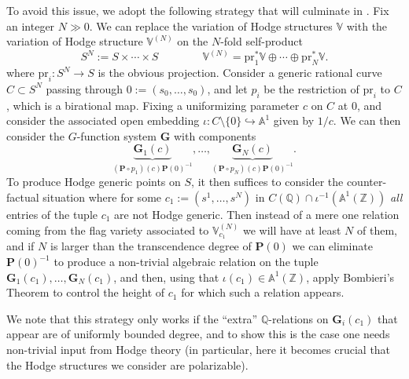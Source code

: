 \documentclass[10pt]{article}
\numberwithin{equation}{section}
\theoremstyle{plain}
\theoremstyle{definition}
\theoremstyle{remark}
\newcommand{\Q}{\mathbb{Q}}
\begin{document}
\medskip

To avoid this issue, we adopt the following strategy that will culminate in . Fix an integer $N \gg 0$. We can replace the variation of Hodge structures $\mathbb{V}$ with the variation of Hodge structure $\mathbb{V}^{(N)}$ on the $N$-fold self-product 
\begin{equation}
\label{SNprod}
S^{N} := S \times \cdots \times S\hspace{4em} \mathbb{V}^{(N)} = \textrm{pr}^{*}_{1} \mathbb{V} \oplus \cdots \oplus \textrm{pr}^{*}_{N} \mathbb{V} .
\end{equation}
where $\textrm{pr}_{i} : S^{N} \to S$ is the obvious projection. Consider a generic rational curve $C \subset S^{N}$ passing through $0 := (s_{0}, \hdots, s_{0})$, and let $p_{i}$ be the restriction of $\textrm{pr}_{i}$ to $C$, which is a birational map. Fixing a uniformizing parameter $c$ on $C$ at $0$, and consider the associated open embedding $\iota : C \setminus \{ 0 \} \hookrightarrow \mathbb{A}^1$ given by $1/c$. We can then consider the $G$-function system $\mathbf{G}$ with components 
\begin{equation}
\label{Nfoldsystem}
\underbrace{\mathbf{G}_1(c)}_{(\mathbf{P} \circ p_{1})(c) \mathbf{P}(0)^{-1}}, \hdots, \underbrace{\mathbf{G}_N(c)}_{(\mathbf{P} \circ p_{N})(c) \mathbf{P}(0)^{-1}} .
\end{equation}
To produce Hodge generic points on $S$, it then suffices to consider the counter-factual situation where for some $c_{1} := (s^{1}, \hdots, s^{N})$ in $C(\mathbb{Q}) \cap \iota^{-1}(\mathbb{A}^1(\mathbb{Z}))$ \emph{all} entries of the tuple $c_{1}$ are not Hodge generic. Then instead of a mere one relation coming from the flag variety associated to $\mathbb{V}^{(N)}_{c_{1}}$ we will have at least $N$ of them, and if $N$ is larger than the transcendence degree of $\mathbf{P}(0)$ we can eliminate $\mathbf{P}(0)^{-1}$ to produce a non-trivial algebraic relation on the tuple $\mathbf{G}{_1}(c_{1}), \hdots, \mathbf{G}_{N}(c_{1})$, and then, using that $\iota(c_{1}) \in \mathbb{A}^1(\mathbb{Z})$, apply Bombieri's Theorem to control the height of $c_{1}$ for which such a relation appears.

We note that this strategy only works if the ``extra'' $\Q$-relations on $\mathbf{G}_{i}(c_{1})$ that appear are of uniformly bounded degree, and to show this is the case one needs non-trivial input from Hodge theory (in particular, here it becomes crucial that the Hodge structures we consider are polarizable). 
\end{document}
